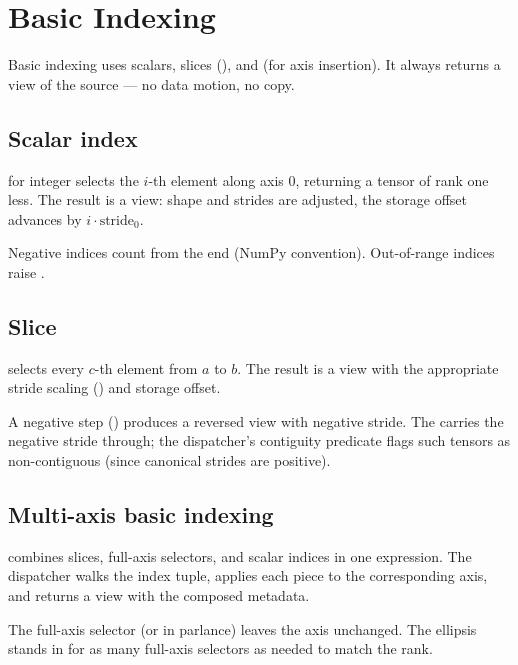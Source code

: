 \section{Basic Indexing}
\label{sec:indexing:basic}

Basic indexing uses scalars, slices (), and 
(for axis insertion). It always returns a view of the source ---
no data motion, no copy.

\subsection{Scalar index}
\label{ssec:indexing:scalar}

 for integer  selects the \(i\)-th element
along axis 0, returning a tensor of rank one less. The result is
a view: shape and strides are adjusted, the storage offset
advances by \(i \cdot \text{stride}_0\).

Negative indices count from the end (NumPy convention).
Out-of-range indices raise .

\subsection{Slice}
\label{ssec:indexing:slice}

 selects every \(c\)-th element from \(a\) to
\(b\). The result is a view with the appropriate stride scaling
() and storage offset.

A negative step () produces a reversed view with
negative stride. The  carries the negative stride
through; the dispatcher's contiguity predicate flags such tensors
as non-contiguous (since canonical strides are positive).

\subsection{Multi-axis basic indexing}
\label{ssec:indexing:multi_basic}

 combines slices, full-axis selectors, and
scalar indices in one expression. The dispatcher walks the index
tuple, applies each piece to the corresponding axis, and returns
a view with the composed metadata.

The full-axis selector \code{:} (or  in
 parlance) leaves the axis unchanged. The
ellipsis  stands in for as many full-axis selectors as
needed to match the rank.


